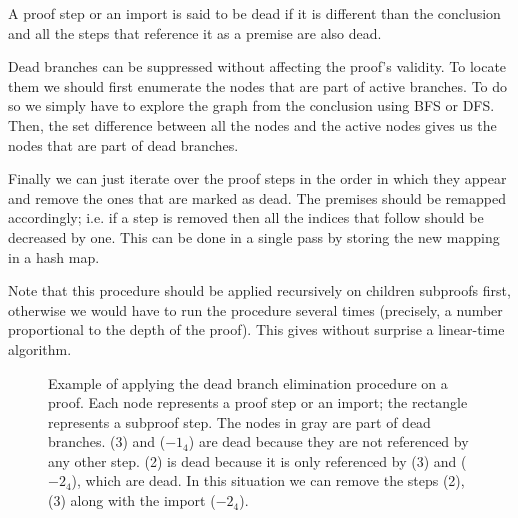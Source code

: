 \begin{definition}
A proof step or an import is said to be dead if it is different than the conclusion and all the steps that reference it as a premise are also dead.
\end{definition}

Dead branches can be suppressed without affecting the proof's validity. To locate them we should first enumerate the nodes that are part of active branches. To do so we simply have to explore the graph from the conclusion using BFS or DFS. Then, the set difference between all the nodes and the active nodes gives us the nodes that are part of dead branches.

Finally we can just iterate over the proof steps in the order in which they appear and remove the ones that are marked as dead. The premises should be remapped accordingly; i.e. if a step is removed then all the indices that follow should be decreased by one. This can be done in a single pass by storing the new mapping in a hash map.

Note that this procedure should be applied recursively on children subproofs first, otherwise we would have to run the procedure several times (precisely, a number proportional to the depth of the proof). This gives without surprise a linear-time algorithm.

\begin{figure}[H]
  \centering
  \caption[Dead branch elimination]{Example of applying the dead branch elimination procedure on a proof. Each node represents a proof step or an import; the rectangle represents a subproof step. The nodes in gray are part of dead branches. (3) and ($-1_4$) are dead because they are not referenced by any other step. (2) is dead because it is only referenced by (3) and ($-2_4$), which are dead. In this situation we can remove the steps (2), (3) along with the import ($-2_4$).}
  \label{fig:synthesis-dead-branches}
\end{figure}


